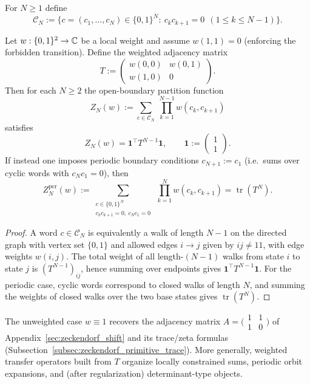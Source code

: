 \begin{definition}
For $N\ge 1$ define
$$
\mathcal{C}_N:=\{c=(c_1,\dots,c_N)\in\{0,1\}^N:\ c_kc_{k+1}=0\ \ (1\le k\le N-1)\}.
$$
\end{definition}

\begin{theorem}
\label{thm:zeckendorf_transfer_matrix}
Let $w:\{0,1\}^2\to\mathbb{C}$ be a local weight and assume $w(1,1)=0$ (enforcing the forbidden transition).
Define the weighted adjacency matrix
$$
T:=\begin{pmatrix}
w(0,0) & w(0,1)\\
w(1,0) & 0
\end{pmatrix}.
$$
Then for each $N\ge 2$ the open-boundary partition function
$$
Z_N(w):=\sum_{c\in\mathcal{C}_N}\ \prod_{k=1}^{N-1} w(c_k,c_{k+1})
$$
satisfies
$$
Z_N(w)=\mathbf{1}^\top T^{N-1}\mathbf{1},
\qquad
\mathbf{1}:=\begin{pmatrix}1\\1\end{pmatrix}.
$$
If instead one imposes periodic boundary conditions $c_{N+1}:=c_1$ (i.e.\ sums over cyclic words with $c_Nc_1=0$), then
$$
Z_N^{\mathrm{per}}(w):=\sum_{\substack{c\in\{0,1\}^N\\ c_kc_{k+1}=0,\ c_Nc_1=0}}\ \prod_{k=1}^{N} w(c_k,c_{k+1})
=\operatorname{tr}(T^N).
$$
\end{theorem}

\begin{proof}
A word $c\in\mathcal{C}_N$ is equivalently a walk of length $N-1$ on the directed graph with vertex set $\{0,1\}$ and allowed edges $i\to j$ given by $ij\ne 11$, with edge weights $w(i,j)$.
The total weight of all length-$(N-1)$ walks from state $i$ to state $j$ is $(T^{N-1})_{ij}$, hence summing over endpoints gives $\mathbf{1}^\top T^{N-1}\mathbf{1}$.
For the periodic case, cyclic words correspond to closed walks of length $N$, and summing the weights of closed walks over the two base states gives $\operatorname{tr}(T^N)$.
\end{proof}

\begin{remark}
The unweighted case $w\equiv 1$ recovers the adjacency matrix $A=\bigl(\begin{smallmatrix}1&1\\1&0\end{smallmatrix}\bigr)$ of Appendix~\ref{sec:zeckendorf_shift} and its trace/zeta formulas (Subsection~\ref{subsec:zeckendorf_primitive_trace}).
More generally, weighted transfer operators built from $T$ organize locally constrained sums, periodic orbit expansions, and (after regularization) determinant-type objects.
\end{remark}

